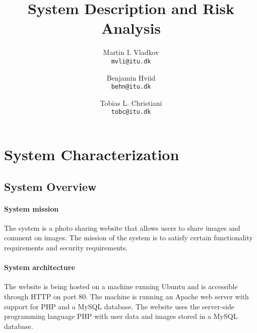 \documentclass{article}
\title{\huge\sffamily\bfseries System Description and Risk Analysis}
\author{
Martin I. Vladkov \\ 
\small \texttt{mvli@itu.dk} 
\and 
Benjamin Hviid \\
\small \texttt{behn@itu.dk} 
\and 
Tobias L. Christiani \\
\small \texttt{tobc@itu.dk} 
}
\begin{document}
\maketitle


\tableofcontents
\pagebreak


\section{System Characterization}

\subsection{System Overview}

\paragraph{System mission}
The system is a photo sharing website that allows users to share images and comment on images.
The mission of the system is to satisfy certain functionality requirements and security requirements.

\paragraph{System architecture}
The website is being hosted on a machine running Ubuntu and is accessible through HTTP on port 80.
The machine is running an Apache web server with support for PHP and a MySQL database.
The website uses the server-side programming language PHP with user data and images stored in a MySQL database.
\end{document}
